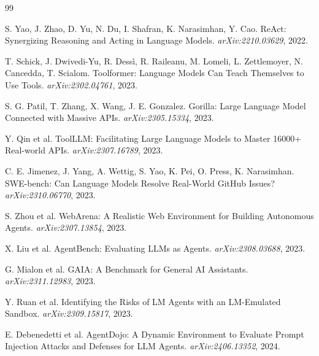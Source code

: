 \documentclass[11pt]{article}
\begin{document}
\begin{thebibliography}{99}

 S. Yao, J. Zhao, D. Yu, N. Du, I. Shafran, K. Narasimhan, Y. Cao.
ReAct: Synergizing Reasoning and Acting in Language Models.
\emph{arXiv:2210.03629}, 2022.

 T. Schick, J. Dwivedi-Yu, R. Dessì, R. Raileanu, M. Lomeli,
L. Zettlemoyer, N. Cancedda, T. Scialom. Toolformer: Language Models Can Teach
Themselves to Use Tools. \emph{arXiv:2302.04761}, 2023.

 S. G. Patil, T. Zhang, X. Wang, J. E. Gonzalez. Gorilla: Large
Language Model Connected with Massive APIs. \emph{arXiv:2305.15334}, 2023.

 Y. Qin et al. ToolLLM: Facilitating Large Language Models to Master
16000+ Real-world APIs. \emph{arXiv:2307.16789}, 2023.

 C. E. Jimenez, J. Yang, A. Wettig, S. Yao, K. Pei, O. Press,
K. Narasimhan. SWE-bench: Can Language Models Resolve Real-World GitHub Issues?
\emph{arXiv:2310.06770}, 2023.

 S. Zhou et al. WebArena: A Realistic Web Environment for Building
Autonomous Agents. \emph{arXiv:2307.13854}, 2023.

 X. Liu et al. AgentBench: Evaluating LLMs as Agents.
\emph{arXiv:2308.03688}, 2023.

 G. Mialon et al. GAIA: A Benchmark for General AI Assistants.
\emph{arXiv:2311.12983}, 2023.

 Y. Ruan et al. Identifying the Risks of LM Agents with an
LM-Emulated Sandbox. \emph{arXiv:2309.15817}, 2023.

 E. Debenedetti et al. AgentDojo: A Dynamic Environment to Evaluate
Prompt Injection Attacks and Defenses for LLM Agents. \emph{arXiv:2406.13352}, 2024.

\end{thebibliography}
\end{document}
